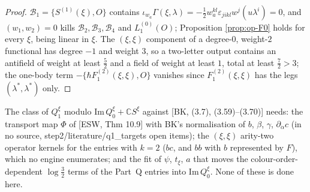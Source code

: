 \begin{proof}
$\mathcal B_1=\{S^{(1)}(\xi),O\}$ contains $\iota_{w_a}\Gamma(\xi,\lambda)=-\tfrac12w_a^{kl}\varepsilon_{jikl}w^j(u\lambda^i)=0$, and $(w_1,w_2)=0$ kills $\mathcal B_2,\mathcal B_3,\mathcal B_4$ and $L_1^{(0)}(O)$; Proposition \ref{prop:op-F0} holds for every $\xi$, being linear in $\xi$. The $(\xi,\xi)$ component of a degree-$0$, weight-$2$ functional has degree $-1$ and weight $3$, so a two-letter output contains an antifield of weight at least $\tfrac52$ and a field of weight at least $1$, total at least $\tfrac72>3$; the one-body term $-\{\hbar F_1^{(2)}(\xi,\xi),O\}$ vanishes since $F_1^{(2)}(\xi,\xi)$ has the legs $(\lambda^*,\lambda^*)$ only.
\end{proof}

\begin{remark}
\label{rem:op-twistopen}
The class of $Q^\xi_1$ modulo $\mathrm{Im}\,Q^\xi_0+\mathbb CS^\xi$ against [BK, (3.7), (3.59)--(3.70)] needs: the transport map $\Phi$ of [ESW, Thm 10.9] with BK's normalisation of $b$, $\beta$, $\gamma$, $\partial_{\dot\alpha}c$ (in no source, step2/literature/q1\_targets open items); the $(\xi,\xi)$ arity-two operator kernels for the entries with $k=2$ ($bc$, and $bb$ with $b$ represented by $F$), which no engine enumerates; and the fit of $\psi$, $t_\xi$, $a$ that moves the colour-order-dependent $\log\tfrac32$ terms of the Part~Q entries into $\mathrm{Im}\,Q^\xi_0$. None of these is done here.
\end{remark}

